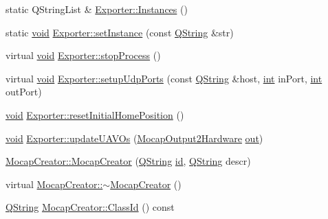 \begin{DoxyCompactItemize}
static Q\-String\-List \& \hyperlink{group___mo_cap_plugin_ga31d137dece30e0f249c4162df4b5b105}{Exporter\-::\-Instances} ()
\item 
static \hyperlink{group___u_a_v_objects_plugin_ga444cf2ff3f0ecbe028adce838d373f5c}{void} \hyperlink{group___mo_cap_plugin_ga8a5fd7b06f55301b2683b72e15ffdd1e}{Exporter\-::set\-Instance} (const \hyperlink{group___u_a_v_objects_plugin_gab9d252f49c333c94a72f97ce3105a32d}{Q\-String} \&str)
\item 
virtual \hyperlink{group___u_a_v_objects_plugin_ga444cf2ff3f0ecbe028adce838d373f5c}{void} \hyperlink{group___mo_cap_plugin_gad00fa0512ade28ce7c6e08f2e4254b59}{Exporter\-::stop\-Process} ()
\item 
virtual \hyperlink{group___u_a_v_objects_plugin_ga444cf2ff3f0ecbe028adce838d373f5c}{void} \hyperlink{group___mo_cap_plugin_ga8790a68ca0c9e28691948cb19eba005d}{Exporter\-::setup\-Udp\-Ports} (const \hyperlink{group___u_a_v_objects_plugin_gab9d252f49c333c94a72f97ce3105a32d}{Q\-String} \&host, \hyperlink{ioapi_8h_a787fa3cf048117ba7123753c1e74fcd6}{int} in\-Port, \hyperlink{ioapi_8h_a787fa3cf048117ba7123753c1e74fcd6}{int} out\-Port)
\item 
\hyperlink{group___u_a_v_objects_plugin_ga444cf2ff3f0ecbe028adce838d373f5c}{void} \hyperlink{group___mo_cap_plugin_ga4bed3f9d105ae145815a651f02083ea0}{Exporter\-::reset\-Initial\-Home\-Position} ()
\item 
\hyperlink{group___u_a_v_objects_plugin_ga444cf2ff3f0ecbe028adce838d373f5c}{void} \hyperlink{group___mo_cap_plugin_ga6ac428e6d5db8fba507314cc56783821}{Exporter\-::update\-U\-A\-V\-Os} (\hyperlink{struct_mocap_output2_hardware}{Mocap\-Output2\-Hardware} \hyperlink{uavobjecttemplate_8m_a2a89187d8e8e8fba509ef9ab5f815d88}{out})
\item 
\hyperlink{group___mo_cap_plugin_ga90d59062e3d2c753e512451b60a977e8}{Mocap\-Creator\-::\-Mocap\-Creator} (\hyperlink{group___u_a_v_objects_plugin_gab9d252f49c333c94a72f97ce3105a32d}{Q\-String} \hyperlink{glext_8h_a58c2a664503e14ffb8f21012aabff3e9}{id}, \hyperlink{group___u_a_v_objects_plugin_gab9d252f49c333c94a72f97ce3105a32d}{Q\-String} descr)
\item 
virtual \hyperlink{group___mo_cap_plugin_ga934741ed7c6804f46b162987c2b9b5c8}{Mocap\-Creator\-::$\sim$\-Mocap\-Creator} ()
\item 
\hyperlink{group___u_a_v_objects_plugin_gab9d252f49c333c94a72f97ce3105a32d}{Q\-String} \hyperlink{group___mo_cap_plugin_ga775e3a65e804fbbeba1680da9b949286}{Mocap\-Creator\-::\-Class\-Id} () const 
\item 

\end{DoxyCompactItemize}
